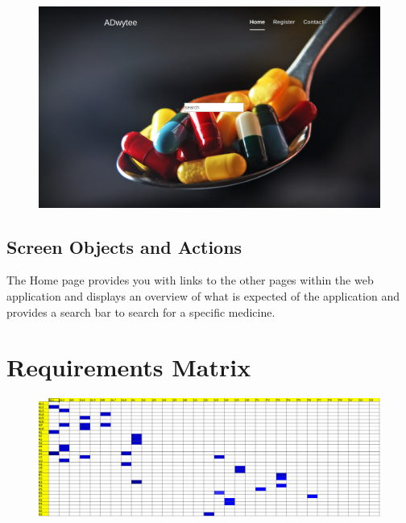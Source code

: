 \documentclass[]{article}
\begin{document}
\begin{figure}[H]
\centering
\includegraphics[scale=0.18]{./Home}
\end{figure}


\subsection {Screen Objects and Actions}
The Home page provides you with links to the other pages within the web application and displays an overview of what is expected of the application and provides a search bar to search for a specific medicine.


\section{Requirements Matrix}

\begin{figure}[H]
\centering
\includegraphics[scale=0.2]{./tractability}
\end{figure}




\end{document}
